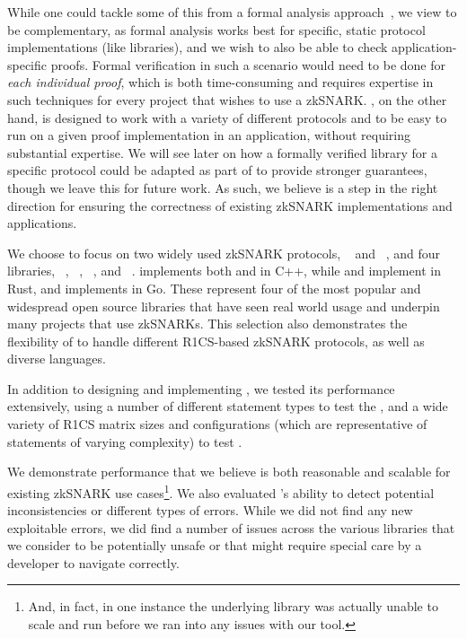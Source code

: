 While one could tackle some of this from a formal analysis approach~\cite{projecteverest}, we view \snarkprobe to be complementary, as formal analysis works best for specific, static protocol implementations (like libraries), and we wish to also be able to check application-specific proofs.  Formal verification in such a scenario would need to be done for \textit{each individual proof}, which is both time-consuming and requires expertise in such techniques for every project that wishes to use a zkSNARK. 
\snarkprobe, on the other hand, is designed to work with a variety of different protocols and to be easy to run on a given proof implementation in an application, without requiring substantial expertise. 
We will see later on how a formally verified library for a specific protocol could be adapted as part of \snarkprobe to provide stronger guarantees, though we leave this for future work.
As such, we believe \snarkprobe is a step in the right direction for ensuring the correctness of existing zkSNARK implementations and applications.

We choose to focus on two widely used zkSNARK protocols, \pinocchio~\cite{parno2016pinocchio,ben2014succinct} and ~\cite{groth2016size}, and four libraries, \libsnark~\cite{libsnark}, \bellman~\cite{bellman}, \arkworks~\cite{arkworks}, and \gnark~\cite{gnark}. \libsnark implements both \pinocchio and  in C++, while \bellman and \arkworks implement  in Rust, and \gnark implements  in Go.  These represent four of the most popular and widespread open source libraries that have seen real world usage and underpin many projects that use zkSNARKs.  This selection also demonstrates the flexibility of \snarkprobe to handle different R1CS-based zkSNARK protocols, as well as diverse languages.

In addition to designing and implementing \snarkprobe, we tested its performance extensively, using a number of different statement types to test the \ConstraintChecker, and a wide variety of R1CS matrix sizes and configurations (which are representative of statements of varying complexity) to test \SnarkFuzzer.

We demonstrate performance that we believe is both reasonable and scalable for existing zkSNARK use cases\footnote{And, in fact, in one instance the underlying library was actually unable to scale and run before we ran into any issues with our tool.}.
We also evaluated \snarkprobe's ability to detect potential inconsistencies or different types of errors.
While we did not find any new exploitable errors, we did find a number of issues across the various libraries that we consider to be potentially unsafe or that might require special care by a developer to navigate correctly.

